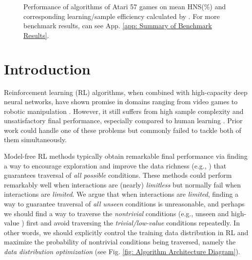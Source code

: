 \documentclass[nohyperref]{article}
\theoremstyle{plain}
\begin{document}
\begin{figure}[!t]
    \centering
	\centering
	\caption{Performance of algorithms of Atari 57 games on mean HNS(\%) and  corresponding learning/sample efficiency calculated by . For more benchmark results, can see App. \ref{app: Summary of Benchmark Results}.} 
	\label{fig: mean med hns and learning efficiency}
\end{figure}


\begin{figure*}[!t]
    \centering
	\centering
	\caption{Algorithm Architecture Diagram. \textbf{(a)} The Isomorphism architecture of GDI, wherein the  behavior policy space (e.g., the soft entropy policy space, ) is constructed by the base policy  with shared parameters (i.e., ) and indexed by . \textbf{(b)} The Heterogeneous architecture of GDI, wherein the behavior policy space is constructed by the base policy  with different parameters (i.e., ) and indexed by . For more details, can see Sec. \ref{Sec: Methodology} and \ref{sec: experiment}.} 
	\label{fig: Algorithm Architecture Diagram}
\end{figure*}





\section{Introduction}
\label{sec: introduction}


Reinforcement learning (RL) algorithms, when combined with high-capacity deep neural networks, have shown promise in domains ranging from video games \citep{dqn} to robotic manipulation \citep{trpo,ppo}. However, it still suffers from high sample complexity and unsatisfactory final performance, especially compared to human learning \citep{tsividis2017human}. Prior work could handle one of these problems but commonly failed to tackle both of them simultaneously.


Model-free RL methods typically obtain remarkable final performance via finding a way to encourage exploration and  improve the data richness (e.g., ) that guarantees traversal of \emph{all possible} conditions. These methods \citep{goexplore,agent57} could perform remarkably well when interactions are (nearly) \emph{limitless} but normally fail when  interactions are \emph{limited}. We argue that when interactions are \emph{limited}, finding a way to guarantee traversal of \emph{all unseen} conditions is unreasonable, and perhaps we should find a way to traverse the \emph{nontrivial} conditions (e.g., unseen \citep{goexplore} and high-value \citep{discor}) first and avoid traversing the \emph{trivial/low-value} conditions repeatedly. In other words, we should explicitly control the training data distribution in RL and maximize the probability of nontrivial conditions being traversed, namely the \emph{data distribution optimization} (see Fig. \ref{fig: Algorithm Architecture Diagram}). 
\end{document}
